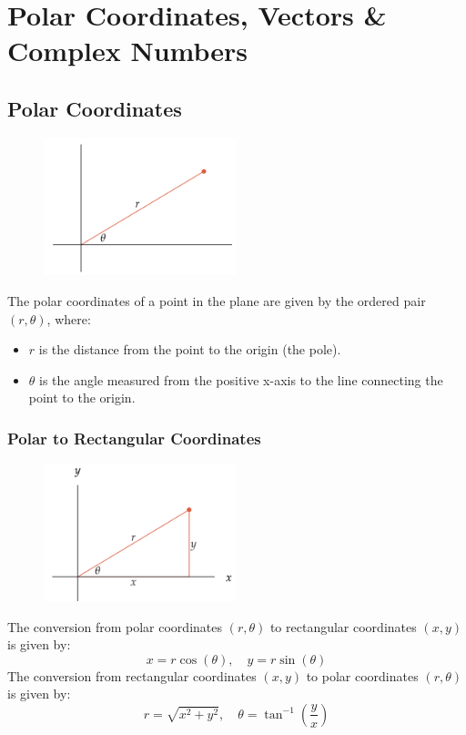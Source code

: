 \chapter{Polar Coordinates, Vectors & Complex Numbers}
\author{Nithin}

\section{Polar Coordinates}
\begin{figure}
    \centering
    \includegraphics[width=0.5\textwidth]{pics/polar1.png}
\end{figure}
The polar coordinates of a point in the plane are given by the ordered pair \((r, \theta)\), where:
\begin{itemize}
    \item \(r\) is the distance from the point to the origin (the pole).
    \item \(\theta\) is the angle measured from the positive x-axis to the line connecting the point to the origin.
\end{itemize}

\subsection{Polar to Rectangular Coordinates}
\begin{figure}
    \centering
    \includegraphics[width=0.5\textwidth]{pics/polar2.png}
\end{figure}
The conversion from polar coordinates \((r, \theta)\) to rectangular coordinates \((x, y)\) is given by:
\[ x = r \cos(\theta), \quad y = r \sin(\theta) \]
The conversion from rectangular coordinates \((x, y)\) to polar coordinates \((r, \theta)\) is given by:
\[ r = \sqrt{x^2 + y^2}, \quad \theta = \tan^{-1}\left(\frac{y}{x}\right) \]

